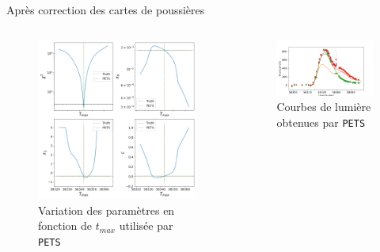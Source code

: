 \documentclass{beamer}
\begin{document}
\begin{frame}{Après correction des cartes de poussières}
\begin{columns}
\begin{column}{.5\textwidth}
\begin{figure}
	\centering
	\includegraphics[width=.9\textwidth]{figures/26_pets_new.png}
	\caption{Variation des paramètres en fonction de $t_{max}$ utilisée par \texttt{PETS}}
\end{figure}
\end{column}

\begin{column}{.5\textwidth}
\begin{figure}
	\centering
	\includegraphics[width=.9\textwidth]{figures/26_lc_pets_new.png}
	\caption{Courbes de lumière obtenues par \texttt{PETS}}
\end{figure}
\end{column}
\end{columns}
\end{frame}
\end{document}
